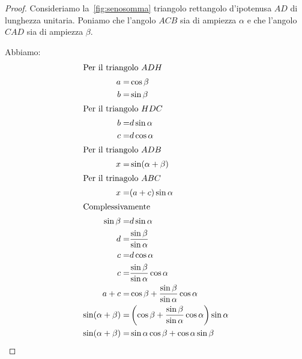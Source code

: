\begin{proof}
	Consideriamo la~\vref{fig:senosomma} triangolo rettangolo d'ipotenusa $AD$ di lunghezza unitaria. Poniamo che l'angolo $ACB$ sia di ampiezza $\alpha$ e che l'angolo $CAD$ sia di ampiezza $\beta$.
	
	Abbiamo:
	\begin{align*}
	\intertext{Per il triangolo $ADH$}
	a=&\cos\beta\\
	b=&\sin\beta\\
	\intertext{Per il triangolo $HDC$}
	b=&d\sin\alpha\\
	c=&d\cos\alpha\\
	\intertext{Per il triangolo $ADB$}
	x=&\sin(\alpha+\beta)\\
	\intertext{Per il trinagolo $ABC$}
	x=&(a+c)\sin\alpha\\
	\intertext{Complessivamente}
	\sin\beta=&d\sin\alpha\\
	d=&\dfrac{\sin\beta}{\sin\alpha}\\
	c=&d\cos\alpha\\
	c=&\dfrac{\sin\beta}{\sin\alpha}\cos\alpha\\
	a+c=&\cos\beta+\dfrac{\sin\beta}{\sin\alpha}\cos\alpha\\
	\sin(\alpha+\beta)=&\left(\cos\beta+\dfrac{\sin\beta}{\sin\alpha}\cos\alpha\right)\sin\alpha\\
	\sin(\alpha+\beta)=&\sin\alpha\cos\beta+\cos\alpha\sin\beta
	\end{align*}
\end{proof}